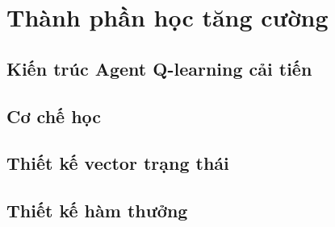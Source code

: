 \chapter{Thành phần học tăng cường}
\section{Kiến trúc Agent Q-learning cải tiến}
\section{Cơ chế học}
\section{Thiết kế vector trạng thái}
\section{Thiết kế hàm thưởng}
